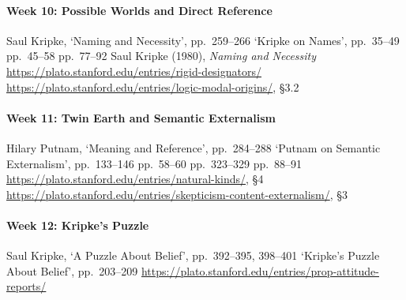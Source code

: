 \paragraph{Week 10: Possible Worlds and Direct Reference}
\begin{readings}
  \req Saul Kripke, `Naming and Necessity', pp.\ 259--266
  \req `Kripke on Names', pp.\ 35--49
  \supp pp.\ 45--58
  \supp pp.\ 77--92
  \supp Saul Kripke (1980), \emph{Naming and Necessity}
  \supp \url{https://plato.stanford.edu/entries/rigid-designators/}
  \supp \url{https://plato.stanford.edu/entries/logic-modal-origins/}, \S3.2
\end{readings}

\paragraph{Week 11: Twin Earth and Semantic Externalism}
\begin{readings}
  \req Hilary Putnam, `Meaning and Reference', pp.\ 284--288
  \req `Putnam on Semantic Externalism', pp.\ 133--146
  \supp pp.\ 58--60
  \supp pp.\ 323--329
  \supp pp.\ 88--91
  \supp \url{https://plato.stanford.edu/entries/natural-kinds/}, \S4
  \supp \url{https://plato.stanford.edu/entries/skepticism-content-externalism/}, \S3
\end{readings}

\paragraph{Week 12: Kripke's Puzzle}
\begin{readings}
  \req Saul Kripke, `A Puzzle About Belief', pp.\ 392--395, 398--401
  \req `Kripke's Puzzle About Belief', pp.\ 203--209
  \supp \url{https://plato.stanford.edu/entries/prop-attitude-reports/}
\end{readings}
